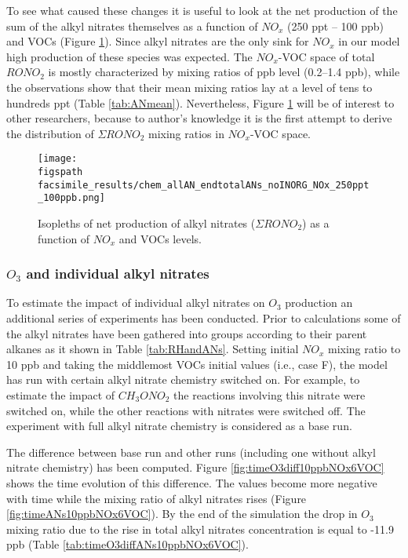 \documentclass[11pt,a4paper]{article}
\newcommand{\figspath}{figures/}
\begin{document}
To see what caused these changes it is useful to look at the net production of the sum of the alkyl nitrates themselves as a function of $NO_x$ (250 ppt -- 100 ppb) and VOCs (Figure \ref{fig:endtotalANs}). Since alkyl nitrates are the only sink for $NO_x$ in our model high production of these species was expected. The $NO_x$-VOC space of total $RONO_2$ is mostly characterized by mixing ratios of ppb level (0.2--1.4 ppb), while the observations show that their mean mixing ratios lay at a level of tens to hundreds ppt (Table \ref{tab:ANmean}). Nevertheless, Figure \ref{fig:endtotalANs} will be of interest to other researchers, because to author's knowledge it is the first attempt to derive the distribution of $\Sigma RONO_2$ mixing ratios in $NO_x$-VOC space.

\begin{figure} %
\centering
\texttt{[image: \\figspath facsimile\_results/chem\_allAN\_endtotalANs\_noINORG\_NOx\_250ppt\_100ppb.png]}
\caption{Isopleths of net production of alkyl nitrates ($\Sigma RONO_2$) as a function of $NO_x$ and VOCs levels.}
\label{fig:endtotalANs}
\end{figure}

\subsubsection{$O_3$ and individual alkyl nitrates}
To estimate the impact of individual alkyl nitrates on $O_3$ production an additional series of experiments has been conducted. Prior to calculations some of the alkyl nitrates have been gathered into groups according to their parent alkanes as it shown in Table \ref{tab:RHandANs}. Setting initial $NO_x$ mixing ratio to 10 ppb and taking the middlemost VOCs initial values (i.e., case F), the model has run with certain alkyl nitrate chemistry switched on. For example, to estimate the impact of $CH_3ONO_2$ the reactions involving this nitrate were switched on, while the other reactions with nitrates were switched off. The experiment with full alkyl nitrate chemistry is considered as a base run.

The difference between base run and other runs (including one without alkyl nitrate chemistry) has been computed. Figure \ref{fig:timeO3diff10ppbNOx6VOC} shows the time evolution of this difference. The values become more negative with time while the mixing ratio of alkyl nitrates rises (Figure \ref{fig:timeANs10ppbNOx6VOC}). By the end of the simulation the drop in $O_3$ mixing ratio due to the rise in total alkyl nitrates concentration is equal to -11.9 ppb (Table \ref{tab:timeO3diffANs10ppbNOx6VOC}). %
\end{document}
